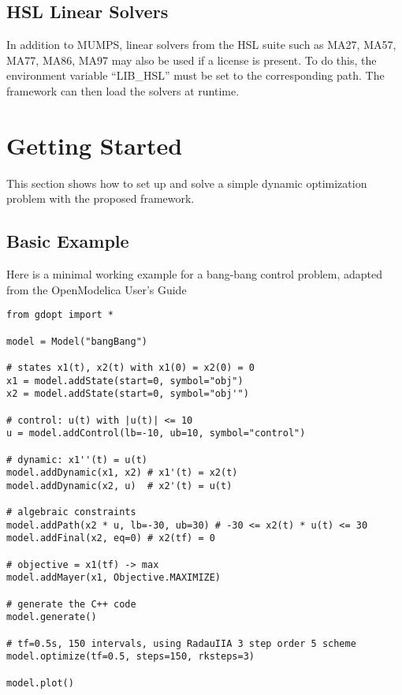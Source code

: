 \documentclass[12pt]{article}
\begin{document}
\subsection{HSL Linear Solvers}
In addition to MUMPS, linear solvers from the HSL suite such as MA27, MA57,
MA77, MA86, MA97\cite{hsl2013collection} may also be used if a license is
present. To do this, the environment variable “LIB\_HSL” must be set to the
corresponding path. The framework can then load the solvers at runtime.

\section{Getting Started}
This section shows how to set up and solve a simple dynamic
optimization problem with the proposed framework.

\subsection{Basic Example}
Here is a minimal working example for a bang-bang control problem, adapted from
the OpenModelica User's Guide \cite{openmodelica}
\begin{lstlisting}
from gdopt import *

model = Model("bangBang")

# states x1(t), x2(t) with x1(0) = x2(0) = 0
x1 = model.addState(start=0, symbol="obj") 
x2 = model.addState(start=0, symbol="obj'")

# control: u(t) with |u(t)| <= 10
u = model.addControl(lb=-10, ub=10, symbol="control") 

# dynamic: x1''(t) = u(t)
model.addDynamic(x1, x2) # x1'(t) = x2(t)
model.addDynamic(x2, u)  # x2'(t) = u(t)

# algebraic constraints
model.addPath(x2 * u, lb=-30, ub=30) # -30 <= x2(t) * u(t) <= 30
model.addFinal(x2, eq=0) # x2(tf) = 0

# objective = x1(tf) -> max
model.addMayer(x1, Objective.MAXIMIZE) 

# generate the C++ code
model.generate() 

# tf=0.5s, 150 intervals, using RadauIIA 3 step order 5 scheme
model.optimize(tf=0.5, steps=150, rksteps=3)

model.plot()
	\end{lstlisting}
\end{document}
